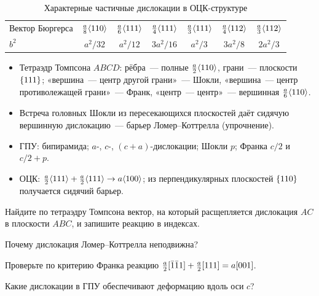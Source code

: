 \begin{table}[ht]
\centering
\caption{Характерные частичные дислокации в ОЦК-структуре}
\label{tab:bcc-partial}
\small
\begin{tabular}{@{}lcccccc@{}}
\toprule
Вектор Бюргерса & $\frac a8\langle 110\rangle$ & $\frac a6\langle 111\rangle$ & $\frac a4\langle 111\rangle$ & $\frac a3\langle 111\rangle$ & $\frac a4\langle 112\rangle$ & $\frac a3\langle 112\rangle$ \\
$b^2$ & $a^2/32$ & $a^2/12$ & $3a^2/16$ & $a^2/3$ & $3a^2/8$ & $2a^2/3$ \\
\bottomrule
\end{tabular}
\end{table}

\begin{itogi}
\begin{itemize}
\item Тетраэдр Томпсона $ABCD$: рёбра~— полные $\frac a2\langle 110\rangle$, грани~—
плоскости $\{111\}$; «вершина~— центр другой грани»~— Шокли,
«вершина~— центр противолежащей грани»~— Франк, «центр~— центр»~—
вершинная $\frac a6\langle 110\rangle$.
\item Встреча головных Шокли из пересекающихся плоскостей даёт сидячую
вершинную дислокацию~— барьер Ломер--Коттрелла (упрочнение).
\item ГПУ: бипирамида; $a$-, $c$-, $(c+a)$-дислокации; Шокли $p$; Франка
$c/2$ и $c/2+p$.
\item ОЦК: $\frac a2\langle 111\rangle+\frac a2\langle 111\rangle\to a\langle 100\rangle$; из
перпендикулярных плоскостей $\{110\}$ получается сидячий барьер.
\end{itemize}
\end{itogi}

\begin{proverka}
\item Найдите по тетраэдру Томпсона вектор, на который расщепляется
дислокация $AC$ в плоскости $ABC$, и запишите реакцию в индексах.
\item Почему дислокация Ломер--Коттрелла неподвижна?
\item Проверьте по критерию Франка реакцию
$\frac a2[\bar{1}\bar{1}1]+\frac a2[111]=a[001]$.
\item Какие дислокации в ГПУ обеспечивают деформацию вдоль оси $c$?
\end{proverka}
